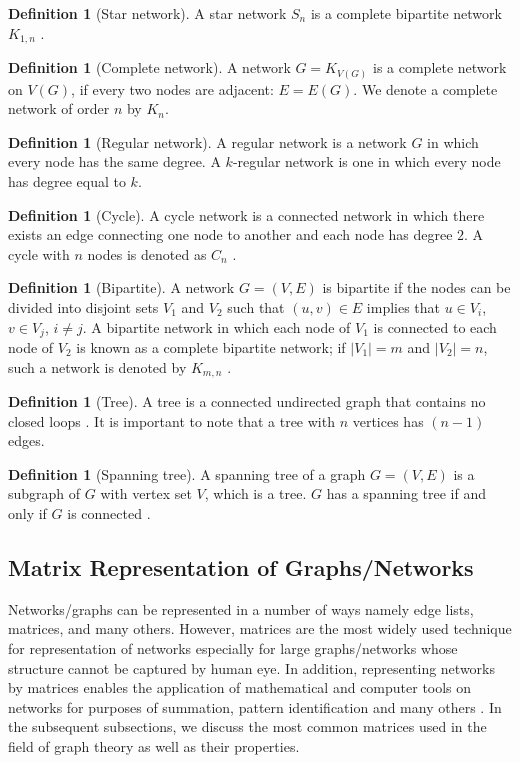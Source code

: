 \documentclass[10pt,a4paper]{article}
\theoremstyle{plain}
\theoremstyle{definition}
\newtheorem{defn}[subsection]{Definition}
\begin{document}
\begin{defn}[Star network]
	A star network $S_n$ is a complete bipartite network $K_{1,n}$ \citep{wilson1970introduction}.
\end{defn}

\begin{defn}[Complete network]
	A network $G = K_{V (G)}$ is a complete network on $V(G)$, if every two nodes are adjacent: $E = E(G)$. We denote a complete network of order $n$ by $K_n$. 
\end{defn}

\begin{defn}[Regular network]
	A regular network is a network $G$ in which every node has the same degree. A $k$-regular network is one in which every node has degree equal to $k$.
\end{defn}

\begin{defn}[Cycle]
	A cycle network is a connected network in which there exists an edge connecting one node to another and each node has degree $2$. A cycle with $n$ nodes is denoted as $C_n$ \citep{wilson1970introduction}.
\end{defn} 

\begin{defn}[Bipartite]
	A network $G=(V,E)$ is bipartite if the nodes can be divided into disjoint sets $V_1$ and $V_2$ such that $(u,v) \in E$ implies that $u \in V_i$, $v \in V_j$, $i\neq j$. A  bipartite network in which each node of $V_1$ is connected to each node of $V_2$ is known as a complete bipartite network; if $|V_1|= m$ and $|V_2|= n$, such a network is denoted by $K_{m,n}$ \citep{newman2010networks}. 
\end{defn}

\begin{defn}[Tree]
	A tree is a connected undirected graph that contains no closed loops \citep{newman2010networks}. It is important to note that a tree with $n$ vertices has $(n-1)$ edges.
\end{defn}

\begin{defn}[Spanning tree]
	A spanning tree of a graph $G=(V,E)$ is a subgraph of $G$ with vertex set $V$, which is a tree. $G$ has a spanning tree if and only if $G$ is connected \citep{newman2010networks}. 
\end{defn}


\subsection{Matrix Representation of Graphs/Networks}
Networks/graphs can be represented in a number of ways namely edge lists, matrices, and many others. However, matrices are the most widely used technique for representation of networks especially for large graphs/networks whose structure cannot be captured by human eye. In addition, representing networks by matrices enables the application of mathematical and computer tools on networks for purposes of summation, pattern identification and many others \citep{chandak2017novel,turan1984succinct}. In the subsequent subsections, we discuss the most common matrices used in the field of graph theory as well as their properties.
\end{document}
